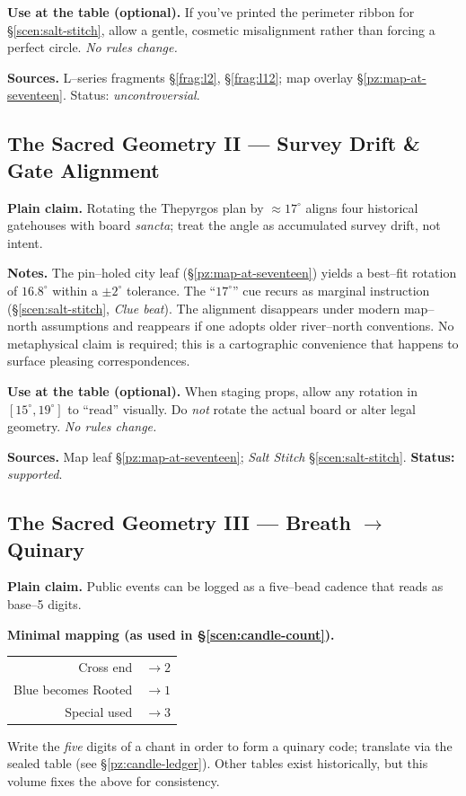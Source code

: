 \documentclass[11pt]{article}
\numberwithin{equation}{section} %
\theoremstyle{plain} %
\theoremstyle{definition} %
\theoremstyle{remark} %
\begin{document}
\medskip
\noindent\textbf{Use at the table (optional).} If you’ve printed the perimeter ribbon for \S\ref{scen:salt-stitch}, allow a gentle, cosmetic misalignment rather than forcing a perfect circle. \emph{No rules change.}

\medskip
\noindent\textbf{Sources.} L–series fragments \S\ref{frag:l2}, \S\ref{frag:l12}; map overlay \S\ref{pz:map-at-seventeen}. Status: \emph{uncontroversial}.

\subsection{The Sacred Geometry II — Survey Drift \& Gate Alignment}
\label{geometry:survey-drift}

\noindent\textbf{Plain claim.} Rotating the Thepyrgos plan by \(\approx 17^\circ\) aligns four historical gatehouses with board \emph{sancta}; treat the angle as accumulated survey drift, not intent.

\medskip
\noindent\textbf{Notes.} The pin–holed city leaf (\S\ref{pz:map-at-seventeen}) yields a best–fit rotation of \(16.8^\circ\) within a \(\pm 2^\circ\) tolerance. The “\(17^\circ\)” cue recurs as marginal instruction (\S\ref{scen:salt-stitch}, \emph{Clue beat}). The alignment disappears under modern map–north assumptions and reappears if one adopts older river–north conventions. No metaphysical claim is required; this is a cartographic convenience that happens to surface pleasing correspondences.

\medskip
\noindent\textbf{Use at the table (optional).} When staging props, allow any rotation in \([15^\circ,19^\circ]\) to “read” visually. Do \emph{not} rotate the actual board or alter legal geometry. \emph{No rules change.}

\medskip
\noindent\textbf{Sources.} Map leaf \S\ref{pz:map-at-seventeen}; \textit{Salt Stitch} \S\ref{scen:salt-stitch}. \textbf{Status:} \emph{supported}.

\subsection{The Sacred Geometry III — Breath $\rightarrow$ Quinary}
\label{geometry:breath-quinary}

\noindent\textbf{Plain claim.} Public events can be logged as a five–bead cadence that reads as base–5 digits.

\medskip
\noindent\textbf{Minimal mapping (as used in \S\ref{scen:candle-count}).}
\begin{center}
\begin{tabular}{rl}
Cross end & \(\rightarrow 2\) \\
Blue becomes Rooted & \(\rightarrow 1\) \\
Special used & \(\rightarrow 3\)
\end{tabular}
\end{center}
Write the \emph{five} digits of a chant in order to form a quinary code; translate via the sealed table (see \S\ref{pz:candle-ledger}). Other tables exist historically, but this volume fixes the above for consistency.
\end{document}
